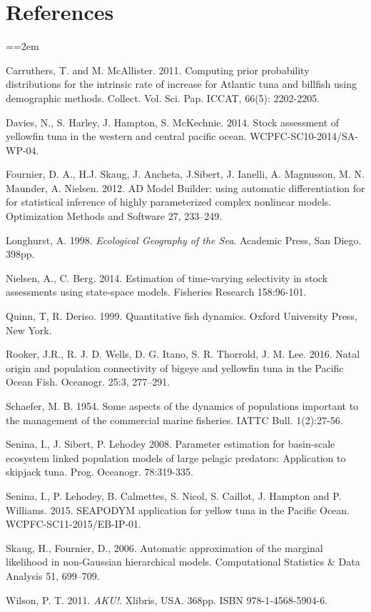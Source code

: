 \documentclass[12pt,letterpaper]{article}
\newcommand\doublespacing{\baselineskip=1.6\normalbaselineskip}
\begin{document}
\section*{References}
{\parindent=0cm \small
\everypar={\hangindent=2em }\par
Carruthers, T. and M. McAllister. 2011.
Computing prior probability distributions for the
intrinsic rate of increase for Atlantic tuna and
billfish using demographic methods.
Collect. Vol. Sci. Pap. ICCAT, 66(5): 2202-2205.

Davies, N., S. Harley, J. Hampton, S. McKechnie. 2014. Stock
assessment of yellowfin tuna in the western and central pacific ocean.
WCPFC-SC10-2014/SA-WP-04.

Fournier, D. A., H.J. Skaug, J. Ancheta, J.Sibert, J. Ianelli, 
A. Magnusson, M. N. Maunder, A. Nielsen. 2012. AD Model Builder:
using automatic differentiation for for statistical inference of highly
parameterized complex nonlinear models. Optimization Methods and
Software 27, 233–249.

Longhurst, A. 1998. {\it Ecological Geography of the Sea}. Academic
Press, San Diego. 398pp.

Nielsen, A., C. Berg. 2014. Estimation of time-varying selectivity
in stock assessments using state-space models. Fisheries Research
158:96-101.


Quinn, T, R. Deriso. 1999. Quantitative fish dynamics. Oxford
University Press, New York.

Rooker, J.R., R. J. D. Wells, D. G. Itano, S. R. Thorrold, J. M. Lee. 2016.
Natal origin and population connectivity of bigeye and
yellowfin tuna in the Pacific Ocean
Fish. Oceanogr. 25:3, 277–291.

Schaefer, M. B. 1954. Some aspects of the dynamics of populations
important to the management of the commercial marine fisheries. IATTC
Bull. 1(2):27-56.

Senina, I., J. Sibert, P. Lehodey  2008. Parameter estimation for
basin-scale ecosystem linked population models of large pelagic
predators: Application to skipjack tuna.  Prog. Oceanogr. 78:319-335.

Senina, I.,  P. Lehodey, B. Calmettes, S. Nicol, S. Caillot,
J. Hampton and P. Williams. 2015.
SEAPODYM application for yellow tuna in the Pacific Ocean.
WCPFC-SC11-2015/EB-IP-01.


Skaug, H., Fournier, D., 2006. Automatic approximation of the marginal
likelihood in non-Gaussian hierarchical models. Computational
Statistics \& Data Analysis 51, 699–709.


Wilson, P. T. 2011. {\it AKU!}. Xlibris, USA. 368pp. ISBN
978-1-4568-5904-6.
\par}
\end{document}
